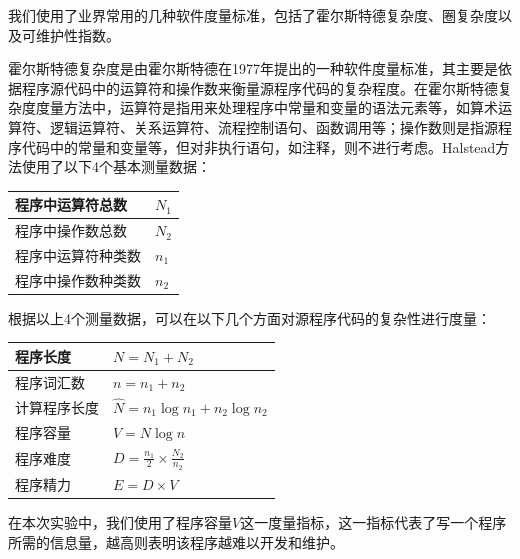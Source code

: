 我们使用了业界常用的几种软件度量标准，包括了霍尔斯特德复杂度\cite{1702603}\cite{Bailey:1981:SSU:1010627.807928}、圈复杂度\cite{1702388}\cite{106988}以及可维护性指数\cite{Heitlager:2007:PMM:1306876.1307252}。

霍尔斯特德复杂度是由霍尔斯特德在1977年提出的一种软件度量标准，其主要是依据程序源代码中的运算符和操作数来衡量源程序代码的复杂程度。在霍尔斯特德复杂度度量方法中，运算符是指用来处理程序中常量和变量的语法元素等，如算术运算符、逻辑运算符、关系运算符、流程控制语句、函数调用等；操作数则是指源程序代码中的常量和变量等，但对非执行语句，如注释，则不进行考虑。Halstead方法使用了以下4个基本测量数据：

\begin{table}[h]  
    \centering  
    \begin{tabular}{|p{5cm}<{\centering}|p{3cm}<{\centering}|}  
      \hline  
      程序中运算符总数 &   $N_1$\\
      \hline  
      程序中操作数总数 &   $N_2$\\  
      \hline  
      程序中运算符种类数 &   $n_1$ \\  
      \hline  
      程序中操作数种类数 &  $n_2$\\  
      \hline  
    \end{tabular}  
\end{table} 

根据以上4个测量数据，可以在以下几个方面对源程序代码的复杂性进行度量：

\begin{table}[h]  
    \centering  
    \begin{tabular}{|p{5cm}<{\centering}|p{5cm}<{\centering}|}  
      \hline  
      程序长度 &   $N = N_1 + N_2$\\
      \hline  
      程序词汇数 &   $n = n_1 + n_2$\\  
      \hline  
      计算程序长度 &  $ \hat{N} = n_1 \log{n_1} + n_2 \log{n_2}$ \\  
      \hline  
      程序容量 &  $V = N \log{n}$\\  
      \hline  
      程序难度 &  $ D = \frac{n_1}{2} \times \frac{N_2}{n_2}$\\  
      \hline  
      程序精力 &  $ E = D \times V$\\  
      \hline  
    \end{tabular}  
\end{table} 

在本次实验中，我们使用了程序容量$V$这一度量指标，这一指标代表了写一个程序所需的信息量，越高则表明该程序越难以开发和维护。

